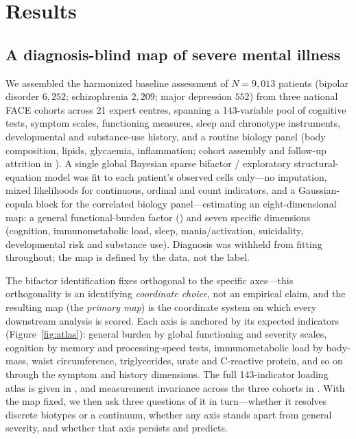 \section{Results}

\subsection{A diagnosis-blind map of severe mental illness}

We assembled the harmonized baseline assessment of $N=9{,}013$ patients (bipolar disorder
$6{,}252$; schizophrenia $2{,}209$; major depression $552$) from three national FACE cohorts
across 21 expert centres, spanning a 143-variable pool of cognitive tests, symptom scales,
functioning measures, sleep and chronotype instruments, developmental and substance-use history,
and a routine biology panel (body composition, lipids, glycaemia, inflammation; cohort assembly
and follow-up attrition in ). A single global
Bayesian sparse bifactor / exploratory structural-equation model was fit to each patient's
observed cells only---no imputation, mixed likelihoods for continuous, ordinal and count
indicators, and a Gaussian-copula block for the correlated biology panel---estimating an
eight-dimensional map: a general functional-burden factor (\Gfac) and seven specific dimensions
(cognition, immunometabolic load, sleep, mania/activation, suicidality, developmental risk and
substance use). Diagnosis was withheld from fitting throughout; the map is defined by the data,
not the label.

The bifactor identification fixes \Gfac{} orthogonal to the specific axes---this orthogonality is
an identifying \emph{coordinate choice}, not an empirical claim, and the resulting map (the
\emph{primary map}) is the coordinate system on which every downstream analysis is scored. Each
axis is anchored by its expected indicators (Figure~\ref{fig:atlas}): general burden by global
functioning and severity scales, cognition by memory and processing-speed tests, immunometabolic
load by body-mass, waist circumference, triglycerides, urate and C-reactive protein, and so on
through the symptom and history dimensions. The full 143-indicator loading atlas is given in
, and measurement invariance across the three cohorts in
. With the map fixed, we then ask three questions of it in turn---whether it
resolves discrete biotypes or a continuum, whether any axis stands apart from general severity, and
whether that axis persists and predicts.

